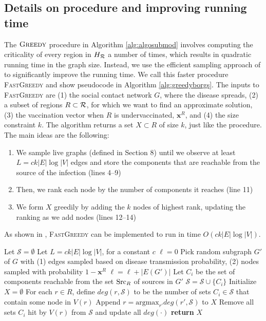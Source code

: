 \subsection{Details on \greedy{} procedure and improving running time}
The $\textsc{Greedy}{}$ procedure in Algorithm \ref{alg:algosubmod} involves computing the criticality of every region in $H_{\mathcal{R}}$ a number of times, which results in quadratic running time in the graph size. 
Instead, we use the efficient sampling approach of \cite{borgs:soda14} to significantly improve the running time. 
We call this faster procedure \textsc{FastGreedy} and show pseudocode in Algorithm \ref{alg:greedyborgs}. The inputs to \textsc{FastGreedy} are (1) the social contact network $G$, where the disease spreads, (2) a subset of regions $R\subset \mathcal{R}$, for which we want to find an approximate solution, (3) the vaccination vector when $R$ is undervaccinated, $\mathbf{x}^R$, and (4) the size constraint $k$. The algorithm returns a set $X \subset R$ of size $k$, just like the \greedy{} procedure. The main ideas are the following:
\begin{enumerate}
    \item We sample live graphs (defined in Section 8) until we observe at least $L=ck|E|\log{|V|}$ edges and store the components that are reachable from the source of the infection (lines 4--9)
    \item Then, we rank each node by the number of components it reaches (line 11)
    \item We form $X$ greedily by adding the $k$ nodes of highest rank, updating the ranking as we add nodes (lines 12--14) 
\end{enumerate}
As shown in \cite{borgs:soda14}, \textsc{FastGreedy} can be implemented to run in time $O(ck|E|\log{|V|})$.

\begin{algorithm}{}
\small
\caption{\small $\textsc{FastGreedy}(G=(V,E), R \subset \R, \mathbf{x}^R, k)$}
\label{alg:greedyborgs}
\begin{algorithmic}[1]
\STATE Let $\mathcal{S}=\emptyset$
\STATE Let $L=ck|E|\log{|V|}$, for a constant $c$
\STATE $\ell=0$
  \STATE Pick random subgraph $G'$ of $G$ with (1) edges sampled based on
disease transmission probability, (2) nodes sampled with probability $1 - \mathbf{x}^R$
  \STATE $\ell = \ell + |E(G')|$
  \STATE Let $C_i$ be the set of components reachable from the set $\text{Src}_R$
of sources in $G'$
  \STATE $\mathcal{S} = \mathcal{S}\cup\{C_i\}$
\ENDWHILE
\STATE Initialize $X=\emptyset$
\STATE
For each $r\in R$, define $deg(r, \mathcal{S})$ to be the number
of sets $C_i\in\mathcal{S}$ that contain some node in $V(r)$
  \STATE Append $r=\text{argmax}_{r'} deg(r',\mathcal{S})$ to $X$
\STATE
Remove all sets $C_i$ hit by $V(r)$ from $\mathcal{S}$ and update all $deg(\cdot)$
\ENDFOR
\STATE \textbf{return} $X$
\end{algorithmic}
\end{algorithm}


